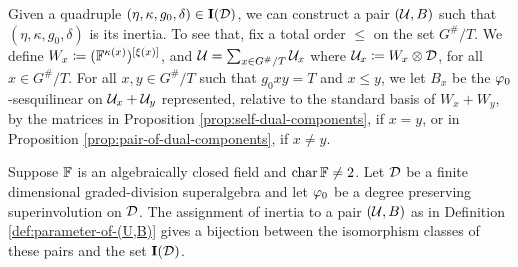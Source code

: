 Given a quadruple $(\eta, \kappa, g_0, \delta) \in \mathbf{I} (\mathcal{D})$, we can construct a pair $(\mathcal U, B)$ such that $(\eta, \kappa, g_0, \delta)$ is its inertia.
To see that, fix a total order $\leq$ on the set $G^\#/T$.
We define $W_x \coloneqq (\mathbb{F}^{\kappa(x)})^{[\xi(x)]}$, and $\mathcal U = \sum_{x \in G^\#/T} \mathcal U_x$ where $\mathcal U_x \coloneqq W_x \otimes \mathcal{D}$, for all $x\in G^\#/T$.
For all $x, y \in G^\#/T$ such that $g_0x y = T$ and $x \leq y$, we let $B_x$ be the $\varphi_0$-sesquilinear on $\mathcal U_x + \mathcal U_y$ represented, relative to the standard basis of $W_x + W_y$, by the matrices in Proposition \ref{prop:self-dual-components}, if $x=y$, or in Proposition \ref{prop:pair-of-dual-components}, if $x\neq y$.

\begin{thm}\label{thm:iso-(U,B)}
	Suppose $\mathbb{F}$ is an algebraically closed field and $\operatorname{char} \mathbb{F} \neq 2$.
	Let $\mathcal{D}$ be a finite dimensional graded-division superalgebra and let $\varphi_0$ be a degree preserving superinvolution on $\mathcal{D}$.
	The assignment of inertia to a pair $(\mathcal U, B)$ as in Definition \ref{def:parameter-of-(U,B)} gives a bijection between the isomorphism classes of these pairs and the set $\mathbf{I} (\mathcal{D})$.
\end{thm}

